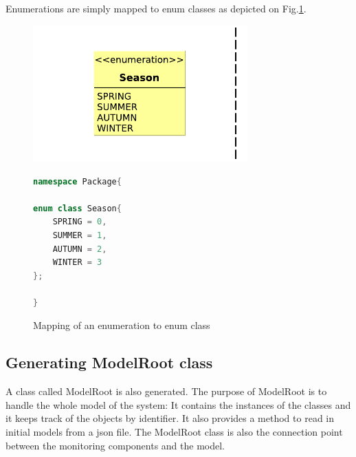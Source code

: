 Enumerations are simply mapped to \cpp{} enum classes as depicted on Fig.\ref{fig:eenum-to-cpp}.

\begin{figure}[H]
	\begin{center}
		
		\begin{minipage}[c]{\textwidth}
		\begin{minipage}[r]{0.52\textwidth}
			\hfill
			\includegraphics[width=0.735\textwidth]{figures/eenum-to-cpp.pdf}
		\end{minipage}
			\hspace{0.05\textwidth}
		\begin{minipage}[c]{0.25\textwidth}
\begin{lstlisting}[language=C++]
namespace Package{

enum class Season{
	SPRING = 0,
	SUMMER = 1,
	AUTUMN = 2,
	WINTER = 3
};

}
\end{lstlisting}			
		\end{minipage}
		\end{minipage}
		\caption{Mapping of an enumeration to \protect\cpp{} enum class }
		\label{fig:eenum-to-cpp}
	\end{center}
\end{figure}

\subsection{ Generating ModelRoot class }

A class called ModelRoot is also generated.
The purpose of ModelRoot is to handle the whole model of the system: 
It contains the instances of the classes and it keeps track of the objects by identifier.
It also provides a method to read in initial models from a json file.
The ModelRoot class is also the connection point between the monitoring components and the model.

